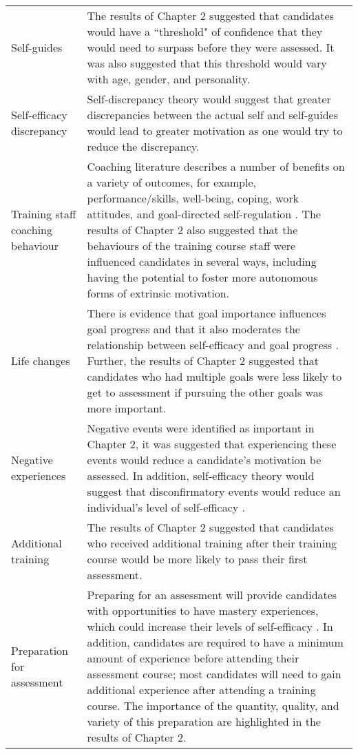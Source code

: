 \documentclass[
  12pt,
  a4paper,
]{book}
\begin{document}
\begin{landscape}
\begin{longtable}[t]{>{\raggedright\arraybackslash}p{3cm}>{\raggedright\arraybackslash}p{21cm}}
\rowcolor{gray!6}  Self-guides & The results of Chapter 2 suggested that candidates would have a ``threshold" of confidence that they would need to surpass before they were assessed. It was also suggested that this threshold would vary with age, gender, and personality.\\
Self-efficacy discrepancy & Self-discrepancy theory \citep[cf.][]{Higgins1987} would suggest that greater discrepancies between the actual self and self-guides would lead to greater motivation as one would try to reduce the discrepancy.\\
\rowcolor{gray!6}  Training staff coaching behaviour & Coaching literature describes a number of benefits on a variety of outcomes, for example, performance/skills, well-being, coping, work attitudes, and goal-directed self-regulation \citep[e.g.,][]{Theeboom2014a, Weinberg2014}. The results of Chapter 2 also suggested that the behaviours of the training course staff were influenced candidates in several ways, including having the potential to foster more autonomous forms of extrinsic motivation.\\
\addlinespace
Life changes & There is evidence that goal importance influences goal progress and that it also moderates the relationship between self-efficacy and goal progress \citep[cf.][]{Beattie2015}. Further, the results of Chapter 2 suggested that candidates who had multiple goals were less likely to get to assessment if pursuing the other goals was more important.\\
\rowcolor{gray!6}  Negative experiences & Negative events were identified as important in Chapter 2, it was suggested that experiencing these events would reduce a candidate's motivation be assessed. In addition, self-efficacy theory would suggest that disconfirmatory events would reduce an individual's level of self-efficacy \citep{Bandura1977, Bandura1982}.\\
Additional training & The results of Chapter 2 suggested that candidates who received additional training after their training course would be more likely to pass their first assessment.\\
\rowcolor{gray!6}  Preparation for assessment & Preparing for an assessment will provide candidates with opportunities to have mastery experiences, which could increase their levels of self-efficacy \citep{Bandura1977, Bandura1982}. In addition, candidates are required to have a minimum amount of experience before attending their assessment course; most candidates will need to gain additional experience after attending a training course. The importance of the quantity, quality, and variety of this preparation are highlighted in the results of Chapter 2.\\

\end{longtable}
\end{landscape}
\end{document}

